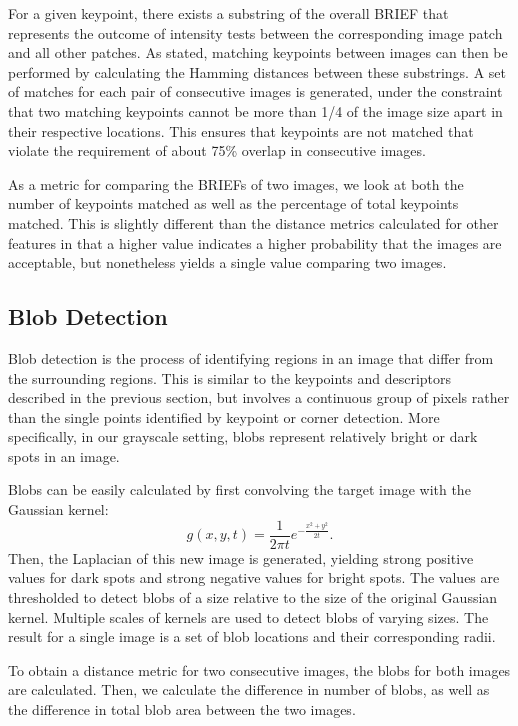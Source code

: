 For a given keypoint, there exists a substring of the overall BRIEF that represents the outcome of intensity tests between the corresponding image patch and all other patches.
As stated, matching keypoints between images can then be performed by calculating the Hamming distances between these substrings.
A set of matches for each pair of consecutive images is generated, under the constraint that two matching keypoints cannot be more than 1/4 of the image size apart in their respective locations.
This ensures that keypoints are not matched that violate the requirement of about 75\% overlap in consecutive images.

As a metric for comparing the BRIEFs of two images, we look at both the number of keypoints matched as well as the percentage of total keypoints matched. 
This is slightly different than the distance metrics calculated for other features in that a higher value indicates a higher probability that the images are acceptable, but nonetheless yields a single value comparing two images.


\subsection{Blob Detection}

Blob detection is the process of identifying regions in an image that differ from the surrounding regions.
This is similar to the keypoints and descriptors described in the previous section, but involves a continuous group of pixels rather than the single points identified by keypoint or corner detection.
More specifically, in our grayscale setting, blobs represent relatively bright or dark spots in an image.

Blobs can be easily calculated by first convolving the target image with the Gaussian kernel:
\begin{equation*}
g(x, y, t) = \frac{1}{2\pi t}e^{-\frac{x^2 + y^2}{2t}} .
\end{equation*}
Then, the Laplacian of this new image is generated, yielding strong positive values for dark spots and strong negative values for bright spots.
The values are thresholded to detect blobs of a size relative to the size of the original Gaussian kernel.
Multiple scales of kernels are used to detect blobs of varying sizes.
The result for a single image is a set of blob locations and their corresponding radii.

To obtain a distance metric for two consecutive images, the blobs for both images are calculated.
Then, we calculate the difference in number of blobs, as well as the difference in total blob area between the two images.


